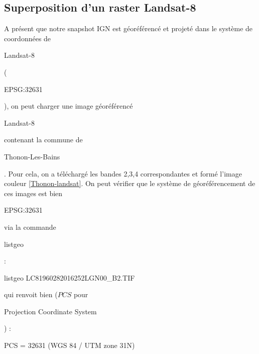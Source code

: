 \documentclass{book}
\begin{document}
\subsection{Superposition d'un raster Landsat-8}

A présent que notre snapshot IGN est géoréférencé et projeté dans le système de coordonnées de \begin{itshape}Landsat-8\end{itshape}
(\begin{itshape}EPSG:32631\end{itshape}), on peut charger une image géoréférencé \begin{itshape}Landsat-8\end{itshape} contenant la 
commune de \begin{itshape}Thonon-Les-Bains\end{itshape}. Pour cela, on a téléchargé les bandes 2,3,4 correspondantes et formé l'image 
couleur  \ref{Thonon-landsat}. On peut vérifier que le système de géoréférencement de ces images est bien \begin{itshape}EPSG:32631\end{itshape} via la 
commande \begin{itshape}listgeo\end{itshape}:\\

\begin{center}
listgeo LC81960282016252LGN00\_B2.TIF
\end{center}

qui renvoit bien ($PCS$ pour \begin{itshape}Projection Coordinate System\end{itshape}) :\\

\begin{center}
PCS = 32631 (WGS 84 / UTM zone 31N)\\
\end{center}

\clearpage
\end{document}
